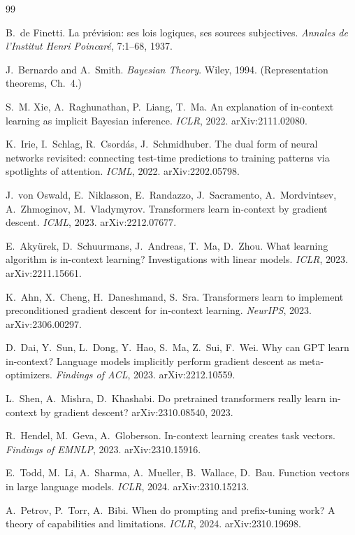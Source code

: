 \documentclass[11pt]{article}
\theoremstyle{plain}
\theoremstyle{definition}
\theoremstyle{remark}
\begin{document}
\begin{thebibliography}{99}\small

 B.~de Finetti.
La pr\'evision: ses lois logiques, ses sources subjectives.
\emph{Annales de l'Institut Henri Poincar\'e}, 7:1--68, 1937.

 J.~Bernardo and A.~Smith.
\emph{Bayesian Theory}. Wiley, 1994. (Representation theorems, Ch.~4.)

 S.~M. Xie, A.~Raghunathan, P.~Liang, T.~Ma.
An explanation of in-context learning as implicit Bayesian inference.
\emph{ICLR}, 2022. arXiv:2111.02080.

 K.~Irie, I.~Schlag, R.~Csord\'as, J.~Schmidhuber.
The dual form of neural networks revisited: connecting test-time predictions
to training patterns via spotlights of attention.
\emph{ICML}, 2022. arXiv:2202.05798.

 J.~von Oswald, E.~Niklasson, E.~Randazzo,
J.~Sacramento, A.~Mordvintsev, A.~Zhmoginov, M.~Vladymyrov.
Transformers learn in-context by gradient descent.
\emph{ICML}, 2023. arXiv:2212.07677.

 E.~Aky\"urek, D.~Schuurmans, J.~Andreas, T.~Ma, D.~Zhou.
What learning algorithm is in-context learning? Investigations with linear
models. \emph{ICLR}, 2023. arXiv:2211.15661.

 K.~Ahn, X.~Cheng, H.~Daneshmand, S.~Sra.
Transformers learn to implement preconditioned gradient descent for
in-context learning. \emph{NeurIPS}, 2023. arXiv:2306.00297.

 D.~Dai, Y.~Sun, L.~Dong, Y.~Hao, S.~Ma, Z.~Sui, F.~Wei.
Why can GPT learn in-context? Language models implicitly perform gradient
descent as meta-optimizers. \emph{Findings of ACL}, 2023. arXiv:2212.10559.

 L.~Shen, A.~Mishra, D.~Khashabi.
Do pretrained transformers really learn in-context by gradient descent?
arXiv:2310.08540, 2023.

 R.~Hendel, M.~Geva, A.~Globerson.
In-context learning creates task vectors. \emph{Findings of EMNLP}, 2023.
arXiv:2310.15916.

 E.~Todd, M.~Li, A.~Sharma, A.~Mueller,
B.~Wallace, D.~Bau. Function vectors in large language models.
\emph{ICLR}, 2024. arXiv:2310.15213.

 A.~Petrov, P.~Torr, A.~Bibi.
When do prompting and prefix-tuning work? A theory of capabilities and
limitations. \emph{ICLR}, 2024. arXiv:2310.19698.


\end{thebibliography}
\end{document}

